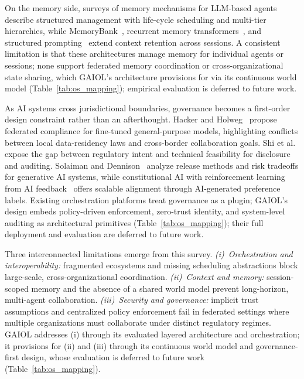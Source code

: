 \documentclass{iopjournal}
\begin{document}
On the memory side, surveys of memory mechanisms for LLM-based agents~\cite{MemoryOS} describe structured management with life-cycle scheduling and multi-tier hierarchies, while MemoryBank~\cite{MemoryBank_ACL23}, recurrent memory transformers~\cite{RecurrentMemory_NeurIPS23}, and structured prompting~\cite{LongContext_ICML24} extend context retention across sessions. A consistent limitation is that these architectures manage memory for individual agents or sessions; none support federated memory coordination or cross-organizational state sharing, which GAIOL's architecture provisions for via its continuous world model (Table~\ref{tab:os_mapping}); empirical evaluation is deferred to future work.

As AI systems cross jurisdictional boundaries, governance becomes a first-order design constraint rather than an afterthought. Hacker and Holweg~\cite{FineTuningReg} propose federated compliance for fine-tuned general-purpose models, highlighting conflicts between local data-residency laws and cross-border collaboration goals. Shi et al.~\cite{FM_Governance} expose the gap between regulatory intent and technical feasibility for disclosure and auditing. Solaiman and Dennison~\cite{SafetyTaxonomy_FAccT23} analyze release methods and risk tradeoffs for generative AI systems, while constitutional AI with reinforcement learning from AI feedback~\cite{bai2022constitutional} offers scalable alignment through AI-generated preference labels. Existing orchestration platforms treat governance as a plugin; GAIOL's design embeds policy-driven enforcement, zero-trust identity, and system-level auditing as architectural primitives (Table~\ref{tab:os_mapping}); their full deployment and evaluation are deferred to future work.

Three interconnected limitations emerge from this survey. \emph{(i)~Orchestration and interoperability:} fragmented ecosystems and missing scheduling abstractions block large-scale, cross-organizational coordination. \emph{(ii)~Context and memory:} session-scoped memory and the absence of a shared world model prevent long-horizon, multi-agent collaboration. \emph{(iii)~Security and governance:} implicit trust assumptions and centralized policy enforcement fail in federated settings where multiple organizations must collaborate under distinct regulatory regimes. GAIOL addresses (i) through its evaluated layered architecture and orchestration; it provisions for (ii) and (iii) through its continuous world model and governance-first design, whose evaluation is deferred to future work (Table~\ref{tab:os_mapping}).
\end{document}
